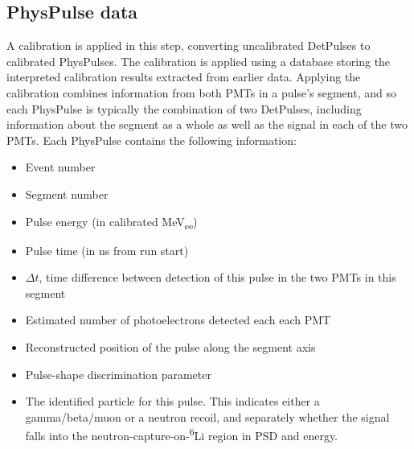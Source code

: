 \subsection{PhysPulse data}
A calibration is applied in this step, converting uncalibrated DetPulses to calibrated PhysPulses.
The calibration is applied using a database storing the interpreted calibration results extracted from earlier data.
Applying the calibration combines information from both PMTs in a pulse's segment,
	and so each PhysPulse is typically the combination of two DetPulses,
    	including information about the segment as a whole as well as the signal in each of the two PMTs.
Each PhysPulse contains the following information:
\begin{itemize}
\item Event number
\item Segment number
\item Pulse energy (in calibrated MeV\textsubscript{ee})
\item Pulse time (in ns from run start)
\item $\Delta t$, time difference between detection of this pulse in the two PMTs in this segment
\item Estimated number of photoelectrons detected each each PMT
\item Reconstructed position of the pulse along the segment axis
\item Pulse-shape discrimination parameter
\item The identified particle for this pulse.
	This indicates either a gamma/beta/muon or a neutron recoil, and separately whether the signal falls into the neutron-capture-on-\textsuperscript{6}Li region in PSD and energy. 
\end{itemize}



